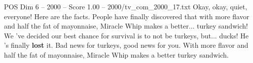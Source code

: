 \begin{textsample}{POS Dim 6 – 2000 – Score 1.00 – 2000/tv\_com\_2000\_17.txt}  \label{ex:f6_pos_085}
Okay, okay, quiet, everyone!
Here are the facts.
People have finally discovered that with more flavor and half the fat of mayonnaise, Miracle Whip makes a better... turkey sandwich!
We 've decided our best chance for survival is to not be turkeys, but... ducks!
He 's finally \textbf{lost} it.
Bad news for turkeys, good news for you.
With more flavor and half the fat of mayonnaise, Miracle Whip makes a better turkey sandwich.

\end{textsample}
